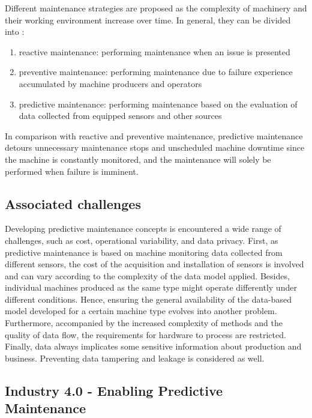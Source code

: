 \documentclass[conference]{IEEEtran}
\begin{document}
Different maintenance strategies are proposed as the complexity of machinery and their working environment increase over time. In general, they can be divided into \cite{b1}:

\begin{enumerate}
	\item reactive maintenance: performing maintenance when an issue is presented
	\item preventive maintenance: performing maintenance due to failure experience accumulated by machine producers and operators
	\item predictive maintenance: performing maintenance based on the evaluation of data collected from equipped sensors and other sources
\end{enumerate}

In comparison with reactive and preventive maintenance, predictive maintenance detours unnecessary maintenance stops and unscheduled machine downtime since the machine is constantly monitored, and the maintenance will solely be performed when failure is imminent.

\subsection{Associated challenges}
\label{sec_associated_challenges}

Developing predictive maintenance concepts is encountered a wide range of challenges, such as cost, operational variability, and data privacy. First, as predictive maintenance is based on machine monitoring data collected from different sensors, the cost of the acquisition and installation of sensors is involved and can vary according to the complexity of the data model applied. Besides, individual machines produced as the same type might operate differently under different conditions. Hence, ensuring the general availability of the data-based model developed for a certain machine type evolves into another problem. Furthermore, accompanied by the increased complexity of methods and the quality of data flow, the requirements for hardware to process are restricted. Finally, data always implicates some sensitive information about production and business. Preventing data tampering and leakage is considered as well.

\subsection{Industry 4.0 - Enabling Predictive Maintenance}
\end{document}
